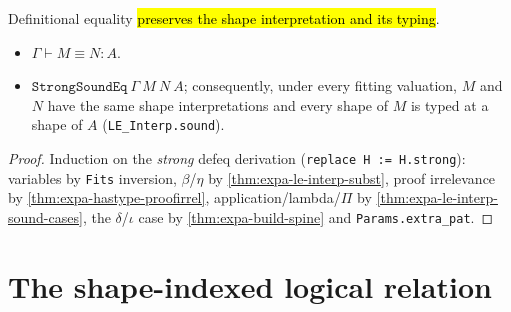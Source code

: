 \begin{theorem}
\label{thm:expa-le-interp-strongsound}
\leanok
{}

 Definitional equality \hl{preserves the shape interpretation and its typing}.
\begin{itemize}
\item {} $\Gamma\vdash M\equiv N:A$.
\item {} $\mathtt{StrongSoundEq}\ \Gamma\ M\ N\ A$; consequently, under every fitting
valuation, $M$ and $N$ have the same shape interpretations and every shape of $M$ is typed at a shape
of $A$ (\texttt{LE\_Interp.sound}).
\end{itemize}
\end{theorem}
\begin{proof}
\leanok
{} Induction on the \emph{strong} defeq derivation (\texttt{replace H := H.strong}): variables by
\texttt{Fits} inversion, $\beta$/$\eta$ by \ref{thm:expa-le-interp-subst}, proof irrelevance by
\ref{thm:expa-hastype-proofirrel}, application/lambda/$\Pi$ by
\ref{thm:expa-le-interp-sound-cases}, the $\delta$/$\iota$ case by \ref{thm:expa-build-spine} and
\texttt{Params.extra\_pat}.
\end{proof}

\section{The shape-indexed logical relation}

